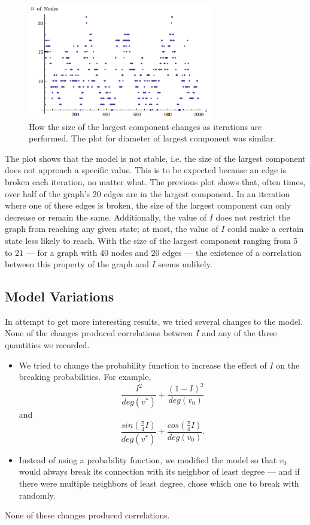 \documentclass[a4paper,10pt]{article}
\begin{document}
\begin{figure}[H]
\label{fig:gc-size-iter}
\begin{center}
\includegraphics[height=5cm]{images/gc_size_iter.png}
\caption{How the size of the largest component changes as iterations are performed. The plot for diameter of largest component was similar.}
\end{center}
\end{figure} 
The plot shows that the model is not stable, i.e. the size of the largest component does not approach a specific value. This is to be expected because an edge is broken each iteration, no matter what. The previous plot shows that, often times, over half of the graph's 20 edges are in the largest component. In an iteration where one of these edges is broken, the size of the largest component can only decrease or remain the same. Additionally, the value of $I$ does not restrict the graph from reaching any given state; at most, the value of $I$ could make a certain state less likely to reach. With the size of the largest component ranging from 5 to 21 --- for a graph with 40 nodes and 20 edges --- the existence of a correlation between this property of the graph and $I$ seems unlikely.

\subsection{Model Variations}
In attempt to get more interesting results, we tried several changes to the model. None of the changes produced correlations between $I$ and any of the three quantities we recorded.

\begin{itemize}

 \item We tried to change the probability function to increase the effect of $I$ on the breaking probabilities. For example,
 \begin{equation}
  \frac{I^2}{deg(v^*)} + \frac{(1 - I)^2}{deg(v_0)}
 \end{equation}
and
 \begin{equation}
  \frac{sin(\frac{\pi}{4}I)}{deg(v^*)} + \frac{cos(\frac{\pi}{4}I)}{deg(v_0)}.
 \end{equation}

 \item Instead of using a probability function, we modified the model so that $v_0$ would always break its connection with its neighbor of least degree --- and if there were multiple neighbors of least degree, chose which one to break with randomly. 

\end{itemize}
 None of these changes produced correlations.
\end{document}
